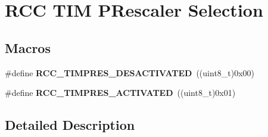 \hypertarget{group___r_c_c_ex___t_i_m___p_rescaler___selection}{}\section{R\+CC T\+IM P\+Rescaler Selection}
\label{group___r_c_c_ex___t_i_m___p_rescaler___selection}
\subsection*{Macros}
\begin{DoxyCompactItemize}
\item 
\#define {\bfseries R\+C\+C\+\_\+\+T\+I\+M\+P\+R\+E\+S\+\_\+\+D\+E\+S\+A\+C\+T\+I\+V\+A\+T\+ED}~((uint8\+\_\+t)0x00)\hypertarget{group___r_c_c_ex___t_i_m___p_rescaler___selection_ga8151264a427f3eec6e6b641b8bbcbafa}{}\label{group___r_c_c_ex___t_i_m___p_rescaler___selection_ga8151264a427f3eec6e6b641b8bbcbafa}

\item 
\#define {\bfseries R\+C\+C\+\_\+\+T\+I\+M\+P\+R\+E\+S\+\_\+\+A\+C\+T\+I\+V\+A\+T\+ED}~((uint8\+\_\+t)0x01)\hypertarget{group___r_c_c_ex___t_i_m___p_rescaler___selection_gae93dc9065111c8aa0e44c30dacc38536}{}\label{group___r_c_c_ex___t_i_m___p_rescaler___selection_gae93dc9065111c8aa0e44c30dacc38536}

\end{DoxyCompactItemize}


\subsection{Detailed Description}
